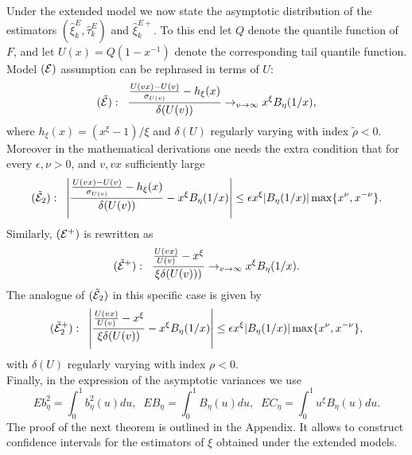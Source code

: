 \documentclass[twoside,leqno,11pt]{article}
\begin{document}
\vspace{0.3cm}\noindent
Under the extended model we now state the asymptotic distribution of the estimators  $(\hat{\xi}_k^{E},\hat{\tau}_k^E)$ and $\hat{\xi}_k^{E+}$. To this end let $Q$ denote the quantile function of $F$, and let $U(x)=Q(1-x^{-1})$ denote the corresponding tail quantile function. 
Model $({\cal{E}})$ assumption can be rephrased in terms of $U$: 
\[
({\tilde{\cal{E}}}):\;\;
\frac{\frac{U(vx)-U(v)}{\sigma_{U(v)}} -h_{\xi}(x)}{\delta (U(v))} \to _{v \to \infty} x^{\xi} B_{\eta}(1/x),
\]
where $h_{\xi}(x)= (x^{\xi}-1)/\xi$ and $\delta (U)$ regularly varying with index $\tilde\rho<0$. 
Moreover in the mathematical derivations one needs the extra condition that for every $\epsilon,\nu>0$, and  $v, vx$ sufficiently large
\[
({\tilde{\cal{E}}}_2):\;\;
\left| \frac{\frac{U(vx)-U(v)}{\sigma_{U(v)}} -h_{\xi}(x)}{\delta (U(v))} - x^{\xi} B_{\eta}(1/x) \right| \leq \epsilon x^{\xi}|B_{\eta}(1/x)| \max\{x^{\nu},x^{-\nu}\}.
\]
Similarly, $({\cal{E}}^+)$ is rewritten as
\[
({\tilde{\cal{E}}}^+):\;\;
\frac{\frac{U(vx)}{U(v)} - x^{\xi}}{\xi \delta(U(v)))} \to_{v \to \infty}  x^{\xi} B_{\eta}(1/x).
\]
The analogue of 
$({\tilde{\cal{E}}}_2)$ in this specific case is given by
\[
({\tilde{\cal{E}}}_2^+):\;\;
\left| \frac{\frac{U(vx)}{U(v)} - x^{\xi}}{\xi\delta(U(v))} -
x^{\xi} B_{\eta}(1/x) \right|
 \leq \epsilon x^{\xi}|B_{\eta}(1/x)| \max\{x^{\nu},x^{-\nu}\},
\]
with $\delta(U)$ regularly varying with index $\rho <0$.\\
Finally, in the expression of the asymptotic variances we use 
\[
Eb^2_{\eta} = \int_0^1 b^2_{\eta} (u)du, \;\;
EB_{\eta} = \int_0^1 B_{\eta} (u)du, \;\;
EC_{\eta} = \int_0^1 u^{\xi}B_{\eta} (u)du.
\]
The proof of the next theorem is outlined in the Appendix. It allows to construct confidence intervals for the estimators of $\xi$ obtained under the extended models.\\
\end{document}

